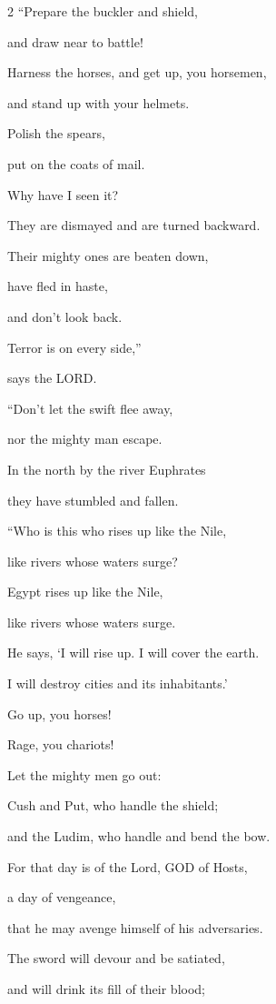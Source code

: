 \begin{multicols}{2}
\myverse{}“Prepare the buckler and shield,

and draw near to battle!


\myverse{}Harness the horses, and get up, you horsemen,

and stand up with your helmets.

Polish the spears,

put on the coats of mail.


\myverse{}Why have I seen it?

They are dismayed and are turned backward.

Their mighty ones are beaten down,

have fled in haste,

and don’t look back.

Terror is on every side,”

says the LORD.


\myverse{}“Don’t let the swift flee away,

nor the mighty man escape.

In the north by the river Euphrates

they have stumbled and fallen.

\vspace{\baselineskip}

\myverse{}“Who is this who rises up like the Nile,

like rivers whose waters surge?


\myverse{}Egypt rises up like the Nile,

like rivers whose waters surge.

He says, ‘I will rise up. I will cover the earth.

I will destroy cities and its inhabitants.’


\myverse{}Go up, you horses!

Rage, you chariots!

Let the mighty men go out:

Cush and Put, who handle the shield;

and the Ludim, who handle and bend the bow.


\myverse{}For that day is of the Lord, GOD of Hosts,

a day of vengeance,

that he may avenge himself of his adversaries.

The sword will devour and be satiated,

and will drink its fill of their blood;


\end{multicols}
